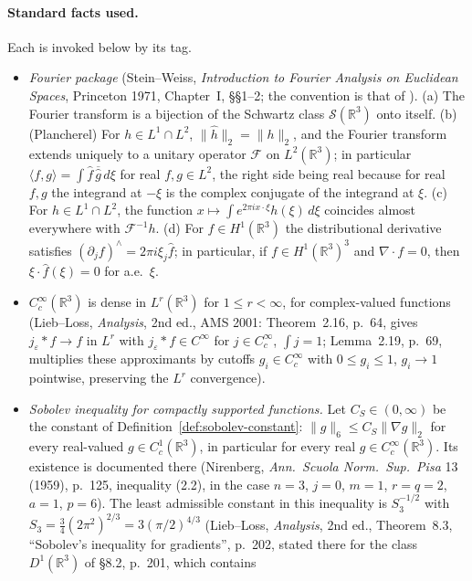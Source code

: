\documentclass[11pt]{article}
\theoremstyle{definition}
\theoremstyle{plain}
\newcommand{\R}{\mathbb R}
\newcommand{\norm}[1]{\lVert #1\rVert}
\begin{document}
\paragraph{Standard facts used.}
Each is invoked below by its tag.
\begin{itemize}
\item[(F1)] \emph{Fourier package} (Stein--Weiss, \emph{Introduction to Fourier
 Analysis on Euclidean Spaces}, Princeton 1971, Chapter~I, \S\S1--2; the
 convention is that of \cite[eq.~(14)]{Tao2013}).  (a) The Fourier transform is
 a bijection of the Schwartz class $\mathcal S(\R^3)$ onto itself.
 (b) (Plancherel) For $h\in L^1\cap L^2$, $\norm{\hat h}_2=\norm h_2$, and the
 Fourier transform extends uniquely to a unitary operator $\mathcal F$ on
 $L^2(\R^3)$; in particular $\langle f,g\rangle=\int\hat f\,\overline{\hat g}\,d\xi$
 for real $f,g\in L^2$, the right side being real because for real $f,g$ the
 integrand at $-\xi$ is the complex conjugate of the integrand at $\xi$.
 (c) For $h\in L^1\cap L^2$,
 the function $x\mapsto\int e^{2\pi ix\cdot\xi}h(\xi)\,d\xi$ coincides almost
 everywhere with $\mathcal F^{-1}h$.  (d) For $f\in H^1(\R^3)$ the
 distributional derivative satisfies $(\partial_jf)^\wedge=2\pi i\xi_j\hat f$;
 in particular, if $f\in H^1(\R^3)^3$ and $\nabla\cdot f=0$, then
 $\xi\cdot\hat f(\xi)=0$ for a.e.\ $\xi$.
\item[(F2)] $C_c^\infty(\R^3)$ is dense in $L^r(\R^3)$ for $1\leq r<\infty$,
 for complex-valued functions (Lieb--Loss, \emph{Analysis}, 2nd ed., AMS 2001:
 Theorem~2.16, p.~64, gives $j_\varepsilon*f\to f$ in $L^r$ with
 $j_\varepsilon*f\in C^\infty$ for $j\in C_c^\infty$, $\int j=1$; Lemma~2.19,
 p.~69, multiplies these approximants by cutoffs $g_i\in C_c^\infty$ with
 $0\leq g_i\leq1$, $g_i\to1$ pointwise, preserving the $L^r$ convergence).
\item[(F3)] \emph{Sobolev inequality for compactly supported functions.}
 Let $C_S\in(0,\infty)$ be the constant of Definition~\ref{def:sobolev-constant}:
 $\norm g_6\leq C_S\norm{\nabla g}_2$ for every real-valued
 $g\in C_c^1(\R^3)$, in particular for every real $g\in C_c^\infty(\R^3)$.
 Its existence is documented there (Nirenberg, \emph{Ann.\ Scuola Norm.\
 Sup.\ Pisa} 13 (1959), p.~125, inequality (2.2), in the case $n=3$, $j=0$,
 $m=1$, $r=q=2$, $a=1$, $p=6$).  The least admissible constant in this
 inequality is $S_3^{-1/2}$ with
 $S_3=\tfrac34(2\pi^2)^{2/3}=3(\pi/2)^{4/3}$ (Lieb--Loss, \emph{Analysis},
 2nd ed., Theorem~8.3, ``Sobolev's inequality for gradients'', p.~202,
 stated there for the class $D^1(\R^3)$ of \S8.2, p.~201, which contains

\end{itemize}
\end{document}
